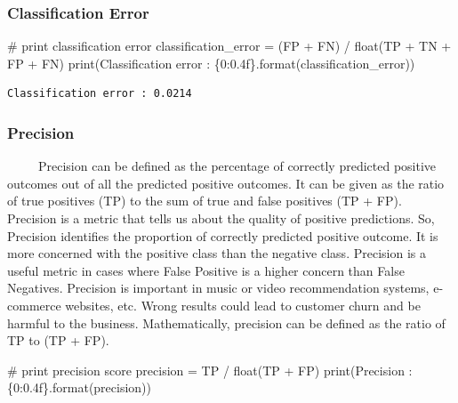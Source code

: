 \documentclass[
  letterpaper,
  DIV=11,
  numbers=noendperiod]{scrreprt}
\newenvironment{Shaded}{\begin{snugshade}}{\end{snugshade}}
\newcommand{\BuiltInTok}[1]{\textcolor[rgb]{0.00,0.23,0.31}{#1}}
\newcommand{\CommentTok}[1]{\textcolor[rgb]{0.37,0.37,0.37}{#1}}
\newcommand{\NormalTok}[1]{\textcolor[rgb]{0.00,0.23,0.31}{#1}}
\newcommand{\OperatorTok}[1]{\textcolor[rgb]{0.37,0.37,0.37}{#1}}
\newcommand{\SpecialCharTok}[1]{\textcolor[rgb]{0.37,0.37,0.37}{#1}}
\newcommand{\StringTok}[1]{\textcolor[rgb]{0.13,0.47,0.30}{#1}}
\begin{document}
\subsubsection{Classification Error}\label{classification-error}

\begin{Shaded}
\begin{Highlighting}[]
\CommentTok{\# print classification error}
\NormalTok{classification\_error }\OperatorTok{=}\NormalTok{ (FP }\OperatorTok{+}\NormalTok{ FN) }\OperatorTok{/} \BuiltInTok{float}\NormalTok{(TP }\OperatorTok{+}\NormalTok{ TN }\OperatorTok{+}\NormalTok{ FP }\OperatorTok{+}\NormalTok{ FN)}
\BuiltInTok{print}\NormalTok{(}\StringTok{\textquotesingle{}Classification error : }\SpecialCharTok{\{0:0.4f\}}\StringTok{\textquotesingle{}}\NormalTok{.}\BuiltInTok{format}\NormalTok{(classification\_error))}
\end{Highlighting}
\end{Shaded}

\begin{verbatim}
Classification error : 0.0214
\end{verbatim}

\subsubsection{Precision}\label{precision}

~~~~~Precision can be defined as the percentage of correctly predicted
positive outcomes out of all the predicted positive outcomes. It can be
given as the ratio of true positives (TP) to the sum of true and false
positives (TP + FP). Precision is a metric that tells us about the
quality of positive predictions. So, Precision identifies the proportion
of correctly predicted positive outcome. It is more concerned with the
positive class than the negative class. Precision is a useful metric in
cases where False Positive is a higher concern than False Negatives.
Precision is important in music or video recommendation systems,
e-commerce websites, etc. Wrong results could lead to customer churn and
be harmful to the business. Mathematically, precision can be defined as
the ratio of TP to (TP + FP).

\begin{Shaded}
\begin{Highlighting}[]
\CommentTok{\# print precision score}
\NormalTok{precision }\OperatorTok{=}\NormalTok{ TP }\OperatorTok{/} \BuiltInTok{float}\NormalTok{(TP }\OperatorTok{+}\NormalTok{ FP)}
\BuiltInTok{print}\NormalTok{(}\StringTok{\textquotesingle{}Precision : }\SpecialCharTok{\{0:0.4f\}}\StringTok{\textquotesingle{}}\NormalTok{.}\BuiltInTok{format}\NormalTok{(precision))}
\end{Highlighting}
\end{Shaded}
\end{document}
